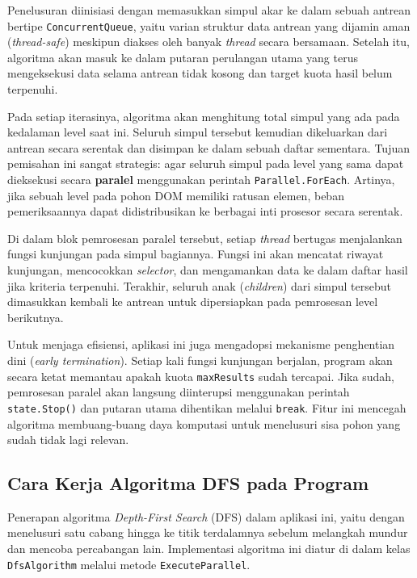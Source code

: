 \documentclass[12pt]{article}
\begin{document}
Penelusuran diinisiasi dengan memasukkan simpul akar ke dalam sebuah antrean bertipe \texttt{ConcurrentQueue}, yaitu varian struktur data antrean yang dijamin aman (\textit{thread-safe}) meskipun diakses oleh banyak \textit{thread} secara bersamaan. Setelah itu, algoritma akan masuk ke dalam putaran perulangan utama yang terus mengeksekusi data selama antrean tidak kosong dan target kuota hasil belum terpenuhi.

Pada setiap iterasinya, algoritma akan menghitung total simpul yang ada pada kedalaman level saat ini. Seluruh simpul tersebut kemudian dikeluarkan dari antrean secara serentak dan disimpan ke dalam sebuah daftar sementara. Tujuan pemisahan ini sangat strategis: agar seluruh simpul pada level yang sama dapat dieksekusi secara \textbf{paralel} menggunakan perintah \texttt{Parallel.ForEach}. Artinya, jika sebuah level pada pohon DOM memiliki ratusan elemen, beban pemeriksaannya dapat didistribusikan ke berbagai inti prosesor secara serentak.

Di dalam blok pemrosesan paralel tersebut, setiap \textit{thread} bertugas menjalankan fungsi kunjungan pada simpul bagiannya. Fungsi ini akan mencatat riwayat kunjungan, mencocokkan \textit{selector}, dan mengamankan data ke dalam daftar hasil jika kriteria terpenuhi. Terakhir, seluruh anak (\textit{children}) dari simpul tersebut dimasukkan kembali ke antrean untuk dipersiapkan pada pemrosesan level berikutnya.

Untuk menjaga efisiensi, aplikasi ini juga mengadopsi mekanisme penghentian dini (\textit{early termination}). Setiap kali fungsi kunjungan berjalan, program akan secara ketat memantau apakah kuota \texttt{maxResults} sudah tercapai. Jika sudah, pemrosesan paralel akan langsung diinterupsi menggunakan perintah \texttt{state.Stop()} dan putaran utama dihentikan melalui \texttt{break}. Fitur ini mencegah algoritma membuang-buang daya komputasi untuk menelusuri sisa pohon yang sudah tidak lagi relevan.

\subsection{Cara Kerja Algoritma DFS pada Program}

Penerapan algoritma \textit{Depth-First Search} (DFS) dalam aplikasi ini, yaitu dengan menelusuri satu cabang hingga ke titik terdalamnya sebelum melangkah mundur dan mencoba percabangan lain. Implementasi algoritma ini diatur di dalam kelas \texttt{DfsAlgorithm} melalui metode \texttt{ExecuteParallel}.
\end{document}
